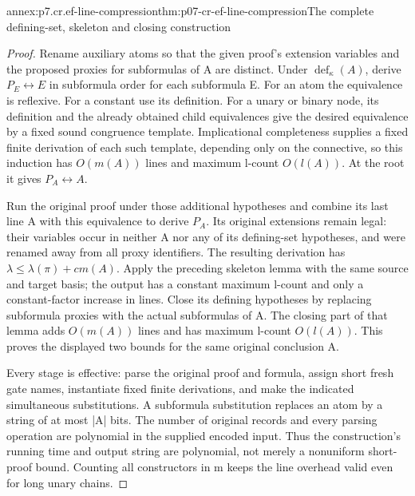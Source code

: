 \begin{annexitem}{annex:p7.cr.ef-line-compression}{thm:p07-cr-ef-line-compression}{The complete defining-set, skeleton and closing construction}
\begin{proof}
Rename auxiliary atoms so that the given proof's extension variables
and the proposed proxies for subformulas of A are distinct. Under
\(\operatorname{def}_{\kappa}(A)\), derive
\(P_E\leftrightarrow E\) in subformula order for each subformula E.
For an atom the equivalence is reflexive. For a constant use its
definition. For a unary or binary node, its definition and the
already obtained child equivalences give the desired equivalence
by a fixed sound congruence template. Implicational completeness
supplies a fixed finite derivation of each such template, depending
only on the connective, so this induction has \(O(m(A))\) lines
and maximum l-count \(O(l(A))\). At the root it gives
\(P_A\leftrightarrow A\).

Run the original proof under those additional hypotheses and
combine its last line A with this equivalence to derive \(P_A\).
Its original extensions remain legal: their variables occur in
neither A nor any of its defining-set hypotheses, and were renamed
away from all proxy identifiers. The resulting derivation has
\(\lambda\leq\lambda(\pi)+c m(A)\). Apply the preceding
skeleton lemma with the same source and target basis; the output
has a constant maximum l-count and only a constant-factor increase
in lines. Close its defining hypotheses by replacing subformula
proxies with the actual subformulas of A. The closing part of
that lemma adds \(O(m(A))\) lines and has maximum l-count
\(O(l(A))\). This proves the displayed two bounds for the
same original conclusion A.

Every stage is effective: parse the original proof and formula,
assign short fresh gate names, instantiate fixed finite derivations,
and make the indicated simultaneous substitutions. A subformula
substitution replaces an atom by a string of at most |A| bits.
The number of original records and every parsing operation are
polynomial in the supplied encoded input. Thus the construction's
running time and output string are polynomial, not merely a
nonuniform short-proof bound. Counting all constructors in m
keeps the line overhead valid even for long unary chains.
\end{proof}
\end{annexitem}

